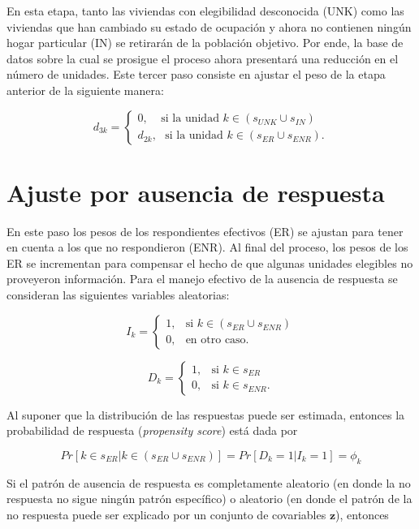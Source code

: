 \documentclass[
  12pt,
]{book}
\begin{document}
En esta etapa, tanto las viviendas con elegibilidad desconocida (UNK) como las viviendas que han cambiado su estado de ocupación y ahora no contienen ningún hogar particular (IN) se retirarán de la población objetivo. Por ende, la base de datos sobre la cual se prosigue el proceso ahora presentará una reducción en el número de unidades. Este tercer paso consiste en ajustar el peso de la etapa anterior de la siguiente manera:

\[
d_{3k} = 
\begin{cases}
0, \ \ \ \ \ \text{si la unidad $k \in (s_{UNK} \cup s_{IN})$ }\\
d_{2k},\ \ \ \text{si la unidad $k \in (s_{ER} \cup s_{ENR})$.}
\end{cases}
\]

\hypertarget{ajuste-por-ausencia-de-respuesta}{%
\section{Ajuste por ausencia de respuesta}\label{ajuste-por-ausencia-de-respuesta}}

En este paso los pesos de los respondientes efectivos (ER) se ajustan para tener en cuenta a los que no respondieron (ENR). Al final del proceso, los pesos de los ER se incrementan para compensar el hecho de que algunas unidades elegibles no proveyeron información. Para el manejo efectivo de la ausencia de respuesta se consideran las siguientes variables aleatorias:

\[
I_k=
\begin{cases}
1,  &\text{si $k \in (s_{ER} \cup s_{ENR})$}\\
0,  &\text{en otro caso.}
\end{cases}
\]

\[
D_k=
\begin{cases}
1,  &\text{si $k \in s_{ER}$}\\
0,  &\text{si $k \in s_{ENR}$.}
\end{cases}
\]

Al suponer que la distribución de las respuestas puede ser estimada, entonces la probabilidad de respuesta (\emph{propensity score}) está dada por

\[
Pr[ k\in s_{ER}|k\in (s_{ER} \cup s_{ENR})]=Pr[D_k = 1|I_k = 1]=\phi_k
\]

Si el patrón de ausencia de respuesta es completamente aleatorio (en donde la no respuesta no sigue ningún patrón específico) o aleatorio (en donde el patrón de la no respuesta puede ser explicado por un conjunto de covariables \(\mathbf{z}\)), entonces
\end{document}
